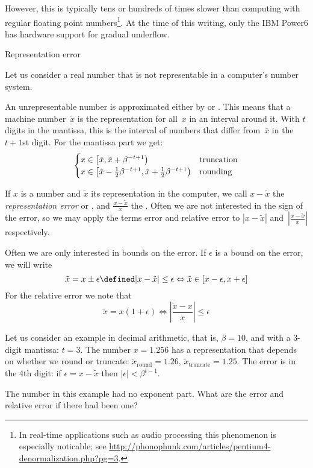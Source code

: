 However, this is typically tens or hundreds of times slower than
computing with regular floating point numbers\footnote{In real-time
applications such as audio processing this phenomenon is especially
noticable;
see \url{http://phonophunk.com/articles/pentium4-denormalization.php?pg=3}.}. 
At the time of this writing, only the IBM Power6 has
hardware support for gradual underflow.

 {Representation error}

Let us consider a real number that is not representable in a
computer's number system.

An unrepresentable number is approximated either by
 or .
This means that a machine number~$\tilde x$ is the representation for
all~$x$ in an interval around it.  With $t$ digits in the
mantissa, this is the interval of numbers that differ
from~$\bar x$ in the $t+1$st digit. For the mantissa
part we get:
\[
\begin{cases}
  x\in \left[\tilde x,\tilde x+\beta^{-t+1}\right)&\hbox{truncation}\\
  x\in \left[\tilde x-\frac12 \beta^{-t+1},\tilde x+\frac12 \beta^{-t+1}\right)
    &\hbox{rounding}
\end{cases}
\]

If $x$ is a number and $\tilde x$ its representation in the computer,
we call $x-\tilde x$ the \emph{representation error} or
, and $\frac{x-\tilde x}{x}$
the . Often we are not
interested in the sign of the error, so we may apply the terms error
and relative error to $|x-\tilde x|$ and~$|\frac{x-\tilde x}{x}|$
respectively.

Often we are only interested in bounds on the error. If $\epsilon$ is
a bound on the error, we will write
\[ \tilde x = x\pm\epsilon \defined
    |x-\tilde x|\leq\epsilon 
    \Leftrightarrow \tilde x\in[x-\epsilon,x+\epsilon]
\]
For the relative error we note that
\[ \tilde x =x(1+\epsilon) \Leftrightarrow
    \left|\frac{\tilde x-x}{x}\right|\leq \epsilon
\]

Let us consider an example in decimal arithmetic, that is, $\beta=10$,
and with a 3-digit mantissa: $t=3$.  The number $x=1.256$ has a
representation that depends on whether we round or truncate: $\tilde
x_{\mathrm{round}}=1.26$, $\tilde x_{\mathrm{truncate}}=1.25$.
The error is in the 4th digit: if $\epsilon=x-\tilde x$ 
then $|\epsilon|<\beta^{t-1}$.
\begin{exercise}
The number in this example had no exponent part. What are the error
and relative error if there had been one?
\end{exercise}

